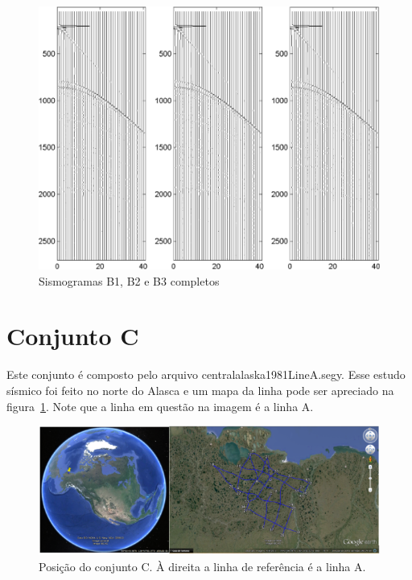\begin{figure}[!h]
\centering
  \includegraphics[scale=1]{fig/fig_B2.png}
  \caption{Sismogramas B1, B2 e B3 completos}
\end{figure}

\pagebreak

\section{Conjunto C}

Este conjunto é composto pelo arquivo centralalaska1981LineA.segy. Esse estudo
sísmico foi feito no norte do Alasca e um mapa da linha pode ser apreciado na
figura~\ref{Figura:geograficamentefigc}. Note que a linha em questão na imagem
é a linha A.

\begin{figure}[ht]
\centering
\includegraphics[scale=1]{fig/gps_img_c.png}
\caption[Posição do conjunto C]{Posição do conjunto C. À direita a linha de
referência é a linha A.}
\label{Figura:geograficamentefigc}
\end{figure}

